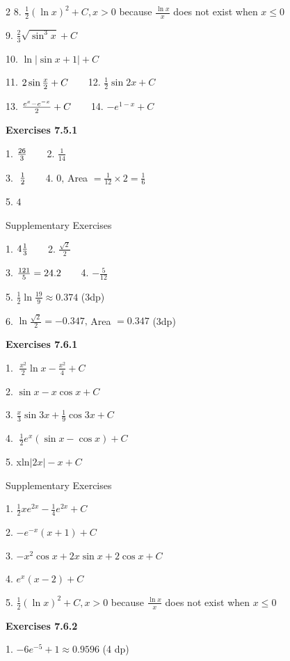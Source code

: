 \begin {multicols}{2}
8. $\frac{1}{2} \left (\ln  x\right )^{2} +C ,x >0$ because $\frac{\ln  x}{x}$ does not exist when $x \leq 0$ 

9. $\frac{2}{3} \sqrt{\sin ^{3} x} +C$ 

10. $\ln  \left \vert \sin  x +1\right \vert  +C$ 

11. $2 \sin  \frac{x}{2} +C\text{\quad \quad }$12. $\frac{1}{2} \sin  2 x +C$ 

13. $\frac{e^{x} -e^{ -x}}{2} +C\text{\quad \quad }$14. $ -e^{1 -x} +C$ 

\textbf{Exercises 7.5.1} 

1. $\frac{26}{3}\text{\quad \quad }$2. $\frac{1}{14}$ 

3. $\;\frac{1}{2}\text{\quad \quad }$4. $0\text{,}$ Area $ =\frac{1}{12} \times 2 =\frac{1}{6}$ 

5. $4$ 

Supplementary Exercises 

1. $4\frac{1}{3}\text{\quad \quad }$2. $\frac{\sqrt{2}}{2}$ 

3. $\frac{121}{5} =24.2\text{\quad \quad }$4. $ -\frac{5}{12}$ 

5. $\frac{1}{2} \ln  \frac{19}{9} \approx 0.374$ (3dp) 

6. $\ln  \frac{\sqrt{2}}{2} = -0.347\text{,}$ Area $ =0.347$ (3dp) 

\textbf{Exercises 7.6.1} 

1. $\;\frac{x^{2}}{2} \ln  x -\frac{x^{2}}{4} +C$ 

2. $\sin  x -x \cos  x +C$ 

3. $\frac{x}{3} \sin  3 x +\frac{1}{9} \cos  3 x +C$ 

4. $\;\frac{1}{2} e^{x} \left (\sin  x -\cos  x\right ) +C$ 

5. xln$\left \vert 2 x\right \vert  -x +C$ 

Supplementary Exercises 

1. $\frac{1}{2} x e^{2 x} -\frac{1}{4} e^{2 x} +C$ 

2. $ -e^{ -x} \left (x +1\right ) +C$ 

3. $ -x^{2} \cos  x +2 x \sin  x +2 \cos  x +C$ 

4. $e^{x} \left (x -2\right ) +C$ 

5. $\frac{1}{2} \left (\ln  x\right )^{2} +C ,x >0$ because $\frac{\ln  x}{x}$ does not exist when $x \leq 0$ 

\textbf{Exercises 7.6.2} 

1. $ -6 e^{ -5} +1 \approx 0.9596$ (4 dp) 


\end{multicols}
